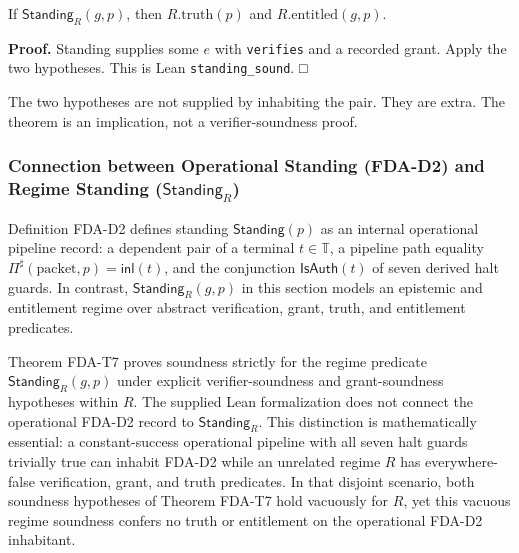 \documentclass[
  11pt,
]{article}
\begin{document}
If \(\mathsf{Standing}_R(g,p)\), then \(R.\mathrm{truth}(p)\) and \(R.\mathrm{entitled}(g,p)\).

\textbf{Proof.} Standing supplies some \(e\) with \texttt{verifies} and a recorded grant. Apply the two hypotheses. This is Lean \texttt{standing\_sound}. □

The two hypotheses are not supplied by inhabiting the pair. They are extra. The theorem is an implication, not a verifier-soundness proof.

\subsubsection{Connection between Operational Standing (FDA-D2) and Regime Standing (\texorpdfstring{\(\mathsf{Standing}_R\)}{Standing\_R})}\label{connection-between-operational-standing-fda-d2-and-regime-standing-standing-r}

Definition FDA-D2 defines standing \(\mathsf{Standing}(p)\) as an internal operational pipeline record: a dependent pair of a terminal \(t\in\mathbb{T}\), a pipeline path equality \(\Pi^\sharp(\mathrm{packet},p)=\mathsf{inl}(t)\), and the conjunction \(\mathsf{IsAuth}(t)\) of seven derived halt guards. In contrast, \(\mathsf{Standing}_R(g,p)\) in this section models an epistemic and entitlement regime over abstract verification, grant, truth, and entitlement predicates.

Theorem FDA-T7 proves soundness strictly for the regime predicate \(\mathsf{Standing}_R(g,p)\) under explicit verifier-soundness and grant-soundness hypotheses within \(R\). The supplied Lean formalization does not connect the operational FDA-D2 record to \(\mathsf{Standing}_R\). This distinction is mathematically essential: a constant-success operational pipeline with all seven halt guards trivially true can inhabit FDA-D2 while an unrelated regime \(R\) has everywhere-false verification, grant, and truth predicates. In that disjoint scenario, both soundness hypotheses of Theorem FDA-T7 hold vacuously for \(R\), yet this vacuous regime soundness confers no truth or entitlement on the operational FDA-D2 inhabitant.
\end{document}
